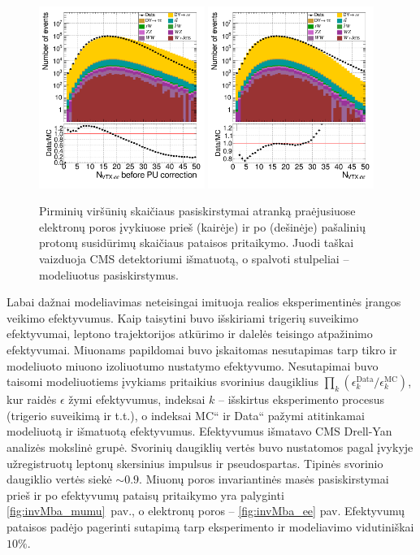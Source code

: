 \documentclass[a4paper, 12pt, oneside]{article}
\newcommand{\ltq}[1]{{\quotedblbase{}#1\textquotedblleft{}}}
\newlength\q
\begin{document}
\begin{figure}[t!]
	\includegraphics[width=0.48\textwidth]{Magistrinis/ee_nVTX_before.png}
	\includegraphics[width=0.48\textwidth]{Magistrinis/ee_nVTX_after.png}
	\vspace{-0.6cm}
	\caption{\label{fig:PUba} Pirminių viršūnių skaičiaus pasiskirstymai atranką praėjusiuose elektronų poros įvykiuose
		prieš (kairėje) ir po (dešinėje) pašalinių protonų susidūrimų skaičiaus pataisos pritaikymo.
		Juodi taškai vaizduoja CMS detektoriumi išmatuotą, o spalvoti stulpeliai -- modeliuotus pasiskirstymus.}
\end{figure}

Labai dažnai modeliavimas neteisingai imituoja realios eksperimentinės įrangos veikimo efektyvumus.
Kaip taisytini buvo išskiriami trigerių suveikimo efektyvumai, leptono trajektorijos atkūrimo ir dalelės teisingo
atpažinimo efektyvumai.
Miuonams papildomai buvo įskaitomas nesutapimas tarp tikro ir modeliuoto miuono izoliuotumo nustatymo efektyvumo.
Nesutapimai buvo taisomi modeliuotiems įvykiams pritaikius svorinius daugiklius $\prod_k(\epsilon_k^{\mathrm{Data}}/\epsilon_k^{\mathrm{MC}})$, 
kur raidės $\epsilon$ žymi efektyvumus, indeksai $k$ -- išskirtus eksperimento procesus (trigerio suveikimą ir t.t.),
o indeksai \ltq{MC} ir \ltq{Data} pažymi atitinkamai modeliuotą ir išmatuotą efektyvumus.
Efektyvumus išmatavo CMS Drell-Yan analizės mokslinė grupė.
Svorinių daugiklių vertės buvo nustatomos pagal įvykyje užregistruotų leptonų skersinius impulsus ir pseudospartas.
Tipinės svorinio daugiklio vertės siekė $\sim\!0.9$.
Miuonų poros invariantinės masės pasiskirstymai prieš ir po efektyvumų pataisų pritaikymo yra palyginti \ref{fig:invMba_mumu}~pav.,
o elektronų poros -- \ref{fig:invMba_ee} pav.
Efektyvumų pataisos padėjo pagerinti sutapimą tarp eksperimento ir modeliavimo vidutiniškai $10\%$.
\end{document}
